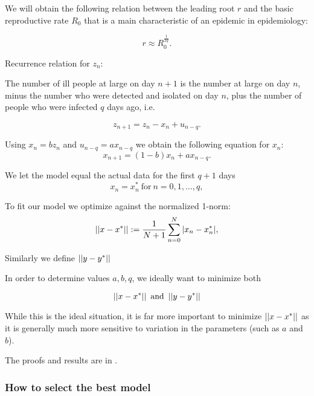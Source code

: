 We will obtain the following relation between the leading root $r$ and the basic reproductive rate $R_0$ that is a main characteristic of an epidemic in epidemiology:

\begin{equation}\label{eq:R0}
    r \approx R_0^{\frac1{2q}}.
\end{equation}

Recurrence relation for $z_n$:

The number of ill people at large on day $n+1$ is the number at large on day $n$, minus the number who were detected and isolated on day $n$, plus the number of people who were infected $q$ days ago, i.e. 

\begin{equation} \label{eq:znrecurr}
    z_{n+1} = z_n - x_n + u_{n-q}.
\end{equation}

Using $x_n = bz_n$ and $u_{n-q} = ax_{n-q}$ we obtain the following equation for $x_n$:
\begin{equation} \label{eq:xnrecurr}
    x_{n+1} = (1 - b) x_n + ax_{n-q}.
\end{equation}

We let the model equal the actual data for the first $q+1$ days
\begin{equation} \label{eq:xn0q}
x_n = x^*_n \ \text{for} \ n = 0, 1, \dots , q,
\end{equation}

 To fit our model we optimize against the normalized 1-norm:
\begin{equation}\label{eq:xnnorm}
    \left|\left|x-x^*\right|\right|:= \frac{1}{N+1} \sum\limits_{n=0}^N |x_n-x_n^*|,
\end{equation}

Similarly we define $\left|\left|y-y^*\right|\right|$

In order to determine values $a,b,q$, we ideally want to minimize both 

\begin{equation} \label{eq:norms}
    \left|\left|x-x^*\right|\right| \ \text{and} \ \left|\left|y-y^*\right|\right|
\end{equation}

While this is the ideal situation, it is far more important to minimize $\left|\left|x-x^*\right|\right|$ as it is generally much more sensitive to variation in the parameters (such as $a$ and $b$).


The proofs and results are in \label{ch:theorems}.

\subsubsection{How to select the best model}

